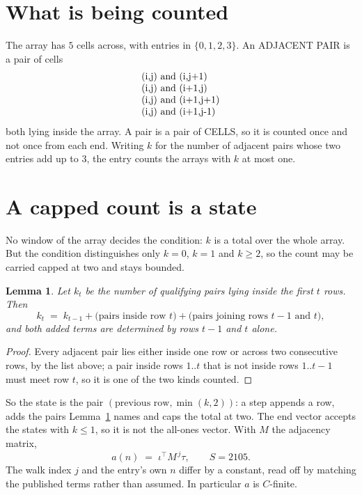 \documentclass[11pt,a4paper]{article}
\theoremstyle{plain}
\newtheorem{lemma}[theorem]{Lemma}
\theoremstyle{definition}
\begin{document}
\section{What is being counted}

The array has $5$ cells across, with entries in $\{0,1,2,3\}$. An ADJACENT PAIR is a pair of cells
\[
\begin{array}{l}
$(i,j)\text{ and }(i,j{+}1)$ \\
$(i,j)\text{ and }(i{+}1,j)$ \\
$(i,j)\text{ and }(i{+}1,j{+}1)$ \\
$(i,j)\text{ and }(i{+}1,j{-}1)$ \\
\end{array}
\]
both lying inside the array. A pair is a pair of CELLS, so it is counted once and not once from
each end. Writing $k$ for the number of adjacent pairs whose two entries add up to $3$, the
entry counts the arrays with $k$ at most one.

\section{A capped count is a state}

No window of the array decides the condition: $k$ is a total over the whole array. But the
condition distinguishes only $k=0$, $k=1$ and $k\ge2$, so the count may be carried capped at
two and stays bounded.

\begin{lemma}\label{lem:cap}
Let $k_t$ be the number of qualifying pairs lying inside the first $t$ rows. Then
\[
k_{t}\;=\;k_{t-1}+\bigl(\text{pairs inside row } t\bigr)
+\bigl(\text{pairs joining rows } t-1 \text{ and } t\bigr),
\]
and both added terms are determined by rows $t-1$ and $t$ alone.
\end{lemma}

\begin{proof}
Every adjacent pair lies either inside one row or across two consecutive rows, by the list
above; a pair inside rows $1..t$ that is not inside rows $1..t-1$ must meet row $t$, so it is
one of the two kinds counted.
\end{proof}

So the state is the pair $(\text{previous row},\min(k,2))$: a step appends a row, adds the
pairs Lemma~\ref{lem:cap} names and caps the total at two. The end vector accepts the states
with $k\le1$, so it is not the all-ones vector. With $M$ the adjacency matrix,
\[
a(n)\;=\;\iota^{\!\top}M^{\,j}\tau ,\qquad S=2105.
\]
The walk index $j$ and the entry's own $n$ differ by a constant, read off by matching the
published terms rather than assumed. In particular $a$ is $C$-finite.
\end{document}
